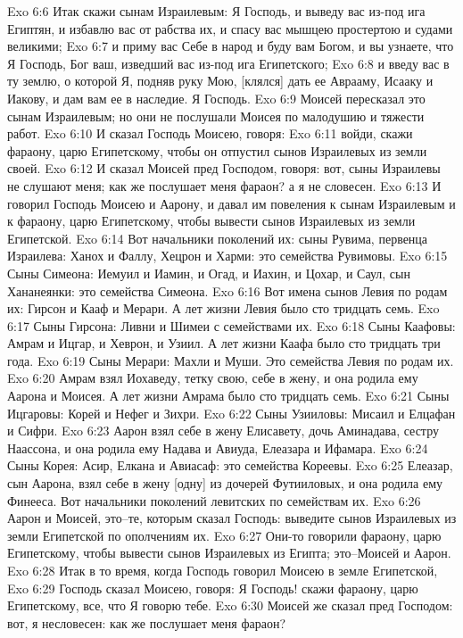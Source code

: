 Exo 6:6  Итак скажи сынам Израилевым: Я Господь, и выведу вас из-под ига Египтян, и избавлю вас от рабства их, и спасу вас мышцею простертою и судами великими;
Exo 6:7  и приму вас Себе в народ и буду вам Богом, и вы узнаете, что Я Господь, Бог ваш, изведший вас из-под ига Египетского;
Exo 6:8  и введу вас в ту землю, о которой Я, подняв руку Мою, [клялся] дать ее Аврааму, Исааку и Иакову, и дам вам ее в наследие. Я Господь.
Exo 6:9  Моисей пересказал это сынам Израилевым; но они не послушали Моисея по малодушию и тяжести работ.
Exo 6:10  И сказал Господь Моисею, говоря:
Exo 6:11  войди, скажи фараону, царю Египетскому, чтобы он отпустил сынов Израилевых из земли своей.
Exo 6:12  И сказал Моисей пред Господом, говоря: вот, сыны Израилевы не слушают меня; как же послушает меня фараон? а я не словесен.
Exo 6:13  И говорил Господь Моисею и Аарону, и давал им повеления к сынам Израилевым и к фараону, царю Египетскому, чтобы вывести сынов Израилевых из земли Египетской.
Exo 6:14  Вот начальники поколений их: сыны Рувима, первенца Израилева: Ханох и Фаллу, Хецрон и Харми: это семейства Рувимовы.
Exo 6:15  Сыны Симеона: Иемуил и Иамин, и Огад, и Иахин, и Цохар, и Саул, сын Хананеянки: это семейства Симеона.
Exo 6:16  Вот имена сынов Левия по родам их: Гирсон и Кааф и Мерари. А лет жизни Левия было сто тридцать семь.
Exo 6:17  Сыны Гирсона: Ливни и Шимеи с семействами их.
Exo 6:18  Сыны Каафовы: Амрам и Ицгар, и Хеврон, и Узиил. А лет жизни Каафа было сто тридцать три года.
Exo 6:19  Сыны Мерари: Махли и Муши. Это семейства Левия по родам их.
Exo 6:20  Амрам взял Иохаведу, тетку свою, себе в жену, и она родила ему Аарона и Моисея. А лет жизни Амрама было сто тридцать семь.
Exo 6:21  Сыны Ицгаровы: Корей и Нефег и Зихри.
Exo 6:22  Сыны Узииловы: Мисаил и Елцафан и Сифри.
Exo 6:23  Аарон взял себе в жену Елисавету, дочь Аминадава, сестру Наассона, и она родила ему Надава и Авиуда, Елеазара и Ифамара.
Exo 6:24  Сыны Корея: Асир, Елкана и Авиасаф: это семейства Кореевы.
Exo 6:25  Елеазар, сын Аарона, взял себе в жену [одну] из дочерей Футииловых, и она родила ему Финееса. Вот начальники поколений левитских по семействам их.
Exo 6:26  Аарон и Моисей, это--те, которым сказал Господь: выведите сынов Израилевых из земли Египетской по ополчениям их.
Exo 6:27  Они-то говорили фараону, царю Египетскому, чтобы вывести сынов Израилевых из Египта; это--Моисей и Аарон.
Exo 6:28  Итак в то время, когда Господь говорил Моисею в земле Египетской,
Exo 6:29  Господь сказал Моисею, говоря: Я Господь! скажи фараону, царю Египетскому, все, что Я говорю тебе.
Exo 6:30  Моисей же сказал пред Господом: вот, я несловесен: как же послушает меня фараон?
